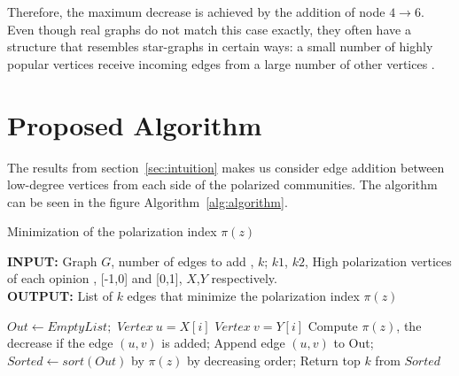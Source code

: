 Therefore, the maximum decrease is achieved by the addition of node $4\rightarrow6$. Even though real graphs do not match this case exactly, they often have a structure that resembles star-graphs in certain ways: a small number of highly popular vertices receive incoming edges from a large number of other vertices \cite{garimella}.

\section{Proposed Algorithm}
\label{sec:proposedAlgorithm}

The results from section~\ref{sec:intuition} makes us consider edge addition between low-degree vertices from each side of the polarized communities. The algorithm can be seen in the figure Algorithm~\ref{alg:algorithm}.

\begin{algorithm}[t]
	\caption{Minimization of the polarization index $\pi(z)$}
	\label{alg:algorithm}
	\begin{flushleft}
        		\textbf{INPUT:} Graph $G$, number of edges to add , $k$; $k1$, $k2$, High polarization vertices of each opinion , [-1,0] and [0,1], $X$,$Y$ respectively.\\
        		\textbf{OUTPUT:} List of $k$ edges that minimize the polarization index $\pi(z)$
	\end{flushleft}
	\begin{algorithmic}[1]
		\STATE $Out \leftarrow Empty List;$
		\STATE $Vertex \ u = X[i]$
		\STATE $Vertex \ v = Y[i]$
		\STATE Compute $\pi(z)$, the decrease if the edge $(u,v)$ is added;
		\STATE Append edge $(u,v)$ to Out;
		\ENDFOR
		\ENDFOR
		\STATE $Sorted \leftarrow sort(Out)$ by $\pi(z)$ by decreasing order;
		\STATE Return top $k$ from $Sorted$
	\end{algorithmic}
\end{algorithm}


